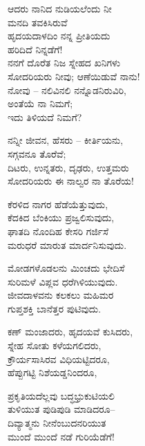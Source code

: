 \begin{myquote}
ಆದರು ನಾನಿದ ನುಡಿಯಲೆಂದು ನೀ\\ಮನದಿ ತವಕಿಸಿರುವೆ\\ಹೃದಯದಾಳದಿಂ ನನ್ನ ಪ್ರೀತಿಯದು\\ಹರಿದಿದೆ ನಿನ್ನಡೆಗೆ!\\ನನಗೆ ದೊರೆತ ನಿಜ ಸ್ನೇಹದ ಖನಿಗಳು\\ಸೋದರಿಯರು ನೀವು; ಆಣೆಯಿಡುವೆ ನಾನು!\\ನೋವು – ನಲಿವಿನಲಿ ನನ್ನೊಡನಿರುವಿರಿ,\\ಅಂತೆಯೆ ನಾ ನಿಮಗೆ;\\ಇದು ತಿಳಿಯದೆ ನಿಮಗೆ?
\end{myquote}

\begin{myquote}
ನನ್ನೀ ಜೀವನ, ಹೆಸರು – ಕೀರ್ತಿಯನು,\\ಸಗ್ಗವನೂ ತೊರೆವೆ;\\ದಿಟರು, ಉನ್ನತರು, ದೃಢರು, ಉತ್ತಮರು\\ಸೋದರಿಯರು ಈ ನಾಲ್ವರ ನಾ ತೊರೆಯ!
\end{myquote}

\begin{myquote}
ಕೆರಳಿದ ನಾಗರ ಹೆಡೆಯೆತ್ತುವುದು,\\ಕೆದಕಿದ ಬೆಂಕಿಯು ಪ್ರಜ್ವಲಿಸುವುದು,\\ಘಾತದಿ ನೊಂದಿಹ ಕೇಸರಿ ಗರ್ಜಿಸೆ\\ಮರುಧರೆ ಮಾರುತ ಮಾರ್ದನಿಸುವುದು.
\end{myquote}

\begin{myquote}
ಮೋಡಗಳೊಡಲನು ಮಿಂಚದು ಭೇದಿಸೆ\\ಸುರಿಮಳೆ ವಿಪ್ಲವ ಧರೆಗಿಳಿಯುವುದು.\\ಜೀವದಾಳವನು ಕಲಕಲು ಮಹಿಮರ\\ಗುಪ್ತಶಕ್ತಿ ಬಾನೆತ್ತರ ಪುಟಿವುದು.
\end{myquote}

\begin{myquote}
ಕಣ್ ಮಂಜಾದರು, ಹೃದಯವೆ ಕುಸಿದರು,\\ಸ್ನೇಹ ಸೋತು ಕಳೆಯಗಲಿದರು,\\ಕ್ರೌರ್ಯಸಾಸಿರವ ವಿಧಿಯಟ್ಟಿದರೂ,\\ಹೆಪ್ಪುಗಟ್ಟಿ ನಿಶೆಯಡ್ಡನಿಂದರೂ,
\end{myquote}

\begin{myquote}
ಪ್ರಕೃತಿಯದೆಲ್ಲವು ಬದ್ಧಭ್ರುಕುಟಿಯಲಿ\\ತುಳಿಯುತ ಪುಡಿಪುಡಿ ಮಾಡಿದರೂ–\\ದಿವ್ಯಾತ್ಮನು ನೀನೆಂಬುದನರಿಯುತ\\ಮುಂದೆ ಮುಂದೆ ನಡೆ ಗುರಿಯೆಡೆಗೆ!
\end{myquote}

